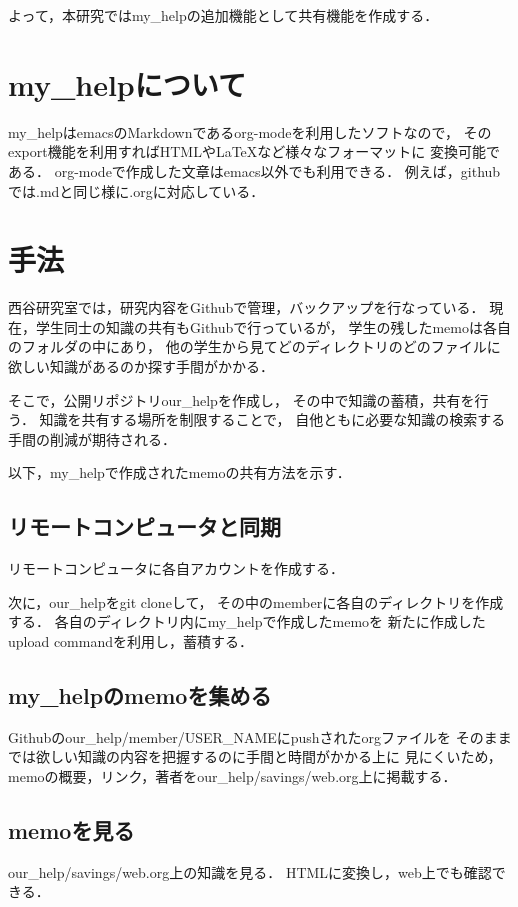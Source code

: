 \documentclass[a4j,twocolumn,uplatex]{jsarticle}
\begin{document}
よって，本研究ではmy\_helpの追加機能として共有機能を作成する．

\section{my\_helpについて}
my\_helpはemacsのMarkdownであるorg-modeを利用したソフトなので，
そのexport機能を利用すればHTMLやLaTeXなど様々なフォーマットに
変換可能である\cite{org-mode}．
org-modeで作成した文章はemacs以外でも利用できる．
例えば，githubでは.mdと同じ様に.orgに対応している．

\section{手法}
西谷研究室では，研究内容をGithubで管理，バックアップを行なっている．
現在，学生同士の知識の共有もGithubで行っているが，
学生の残したmemoは各自のフォルダの中にあり，
他の学生から見てどのディレクトリのどのファイルに
欲しい知識があるのか探す手間がかかる．

そこで，公開リポジトリour\_helpを作成し，
その中で知識の蓄積，共有を行う．
知識を共有する場所を制限することで，
自他ともに必要な知識の検索する手間の削減が期待される．

以下，my\_helpで作成されたmemoの共有方法を示す．
\subsection{リモートコンピュータと同期}
\label{sec-2-1}
リモートコンピュータに各自アカウントを作成する．

次に，our\_helpをgit cloneして，
その中のmemberに各自のディレクトリを作成する．
各自のディレクトリ内にmy\_helpで作成したmemoを
新たに作成したupload commandを利用し，蓄積する．

\subsection{my\_helpのmemoを集める}
\label{sec-2-2}
Githubのour\_help/member/USER\_NAMEにpushされたorgファイルを
そのままでは欲しい知識の内容を把握するのに手間と時間がかかる上に
見にくいため，
memoの概要，リンク，著者をour\_help/savings/web.org上に掲載する．


\subsection{memoを見る}
\label{sec-2-3}
our\_help/savings/web.org上の知識を見る．
HTMLに変換し，web上でも確認できる．
\end{document}
